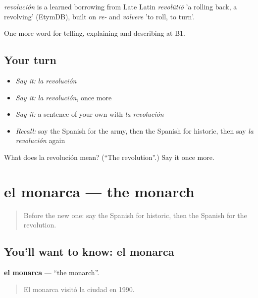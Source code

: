 \begin{cousinweb}
\emph{revolución} is a learned borrowing from Late Latin \emph{revolūtiō} 'a rolling back, a revolving' (EtymDB), built on \emph{re-} and \emph{volvere} 'to roll, to turn'.
\end{cousinweb}

\begin{grammarlens}[title={What you've built}]
One more word for telling, explaining and describing at B1.
\end{grammarlens}

\subsection*{Your turn}
\begin{itemize}
\raggedright
  \item \emph{Say it:} \emph{la revolución}
  \item \emph{Say it:} \emph{la revolución}, once more
  \item \emph{Say it:} a sentence of your own with \emph{la revolución}
  \item \emph{Recall:} say the Spanish for the army, then the Spanish for historic, then say \emph{la revolución} again
\end{itemize}

\begin{tcolorbox}[breakable,colback=teal!4,colframe=teal!35!black,title={Before you move on}]
What does la revolución mean? (\textquotedblleft{}The revolution\textquotedblright{}.) Say it once more.
\end{tcolorbox}
\section[el monarca]{el monarca — the monarch}

\label{lesson:ES-C568-monarca}



\begin{quote}
Before the new one: say the Spanish for historic, then the Spanish for the revolution.
\end{quote}

\subsection*{You'll want to know: el monarca}
\textbf{el monarca} — \textquotedblleft{}the monarch\textquotedblright{}.

\begin{quote}
El monarca visitó la ciudad en 1990.
\end{quote}

